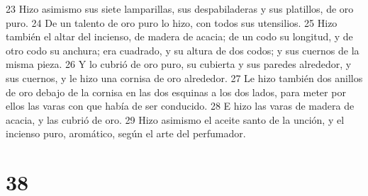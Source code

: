 23 Hizo asimismo sus siete lamparillas, sus despabiladeras y sus platillos, de oro puro.
24 De un talento de oro   puro lo hizo, con todos sus utensilios.
25 Hizo también el altar del incienso, de madera de acacia; de un codo su longitud, y de otro codo su anchura; era cuadrado, y su altura de dos codos; y sus cuernos de la misma pieza.
26 Y lo cubrió de oro puro, su cubierta y sus paredes alrededor, y sus cuernos, y le hizo una cornisa de oro alrededor.
27 Le hizo también dos anillos de oro debajo de la cornisa en las dos esquinas a los dos lados, para meter por ellos las varas con que había de ser conducido.
28 E hizo las varas de madera de acacia, y las cubrió de oro.
29 Hizo asimismo el aceite santo de la unción, y el incienso puro, aromático, según el arte del perfumador.

\chapter{38}

